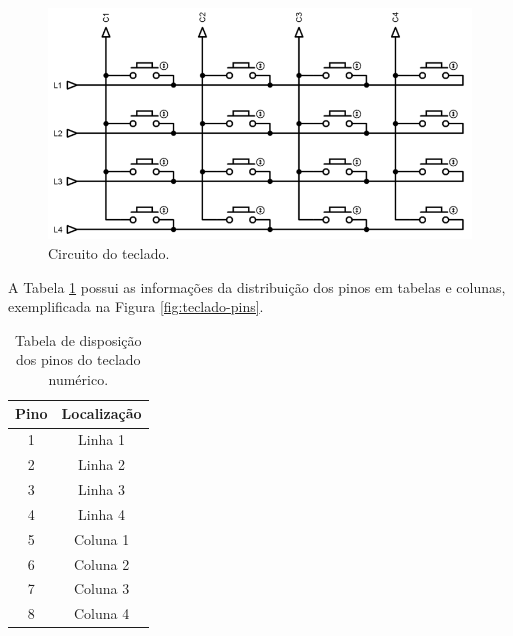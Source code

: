 \begin{figure}[htbp]
	\centering
	\includegraphics[scale=0.4]{figuras/matrix-1024x558.png}
	\caption{Circuito do teclado.}
	\label{fig:teclado-conexoes}
\end{figure}

A Tabela \ref{table:pinosteclado} possui as informações da distribuição dos pinos em tabelas e colunas, exemplificada na Figura \ref{fig:teclado-pins}.

\begin{table}[h!]
	\begin{center}
		\begin{tabular}{ |c|c| }
			\hline
			\rowcolor{lightgray} Pino & Localização \\
			 \hline 
				1 & Linha 1 \\
			 \hline 
				2 & Linha 2 \\
			 \hline 
				3 & Linha 3 \\
			 \hline 
				4 & Linha 4 \\
			 \hline 
				5 & Coluna 1 \\
			 \hline 
				6 & Coluna 2 \\
			 \hline 
				7 & Coluna 3 \\
			 \hline 
				8 & Coluna 4 \\
			\hline
		\end{tabular}
	\caption{Tabela de disposição dos pinos do teclado numérico.}
	\label{table:pinosteclado}
	\end{center}
\end{table}

